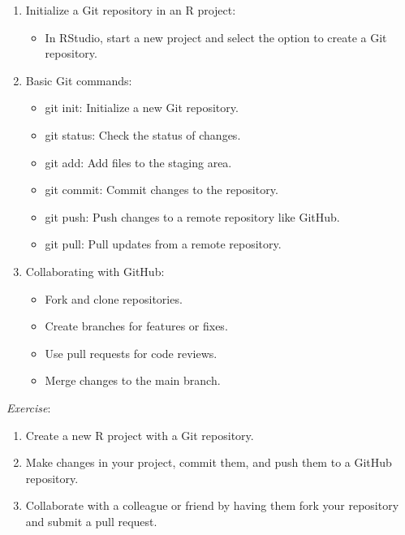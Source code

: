 \documentclass[
]{book}
\providecommand{\tightlist}{%
  \setlength{\itemsep}{0pt}\setlength{\parskip}{0pt}}
\begin{document}
\begin{enumerate}
\def\labelenumi{\arabic{enumi}.}
\setcounter{enumi}{2}
\tightlist
\item
  Initialize a Git repository in an R project:

  \begin{itemize}
  \tightlist
  \item
    In RStudio, start a new project and select the option to create a Git repository.
  \end{itemize}
\item
  Basic Git commands:

  \begin{itemize}
  \tightlist
  \item
    git init: Initialize a new Git repository.
  \item
    git status: Check the status of changes.
  \item
    git add: Add files to the staging area.
  \item
    git commit: Commit changes to the repository.
  \item
    git push: Push changes to a remote repository like GitHub.
  \item
    git pull: Pull updates from a remote repository.
  \end{itemize}
\item
  Collaborating with GitHub:

  \begin{itemize}
  \tightlist
  \item
    Fork and clone repositories.
  \item
    Create branches for features or fixes.
  \item
    Use pull requests for code reviews.
  \item
    Merge changes to the main branch.
  \end{itemize}
\end{enumerate}

\emph{Exercise}:

\begin{enumerate}
\def\labelenumi{\arabic{enumi}.}
\tightlist
\item
  Create a new R project with a Git repository.
\item
  Make changes in your project, commit them, and push them to a GitHub repository.
\item
  Collaborate with a colleague or friend by having them fork your repository and submit a pull request.
\end{enumerate}

  
\end{document}
